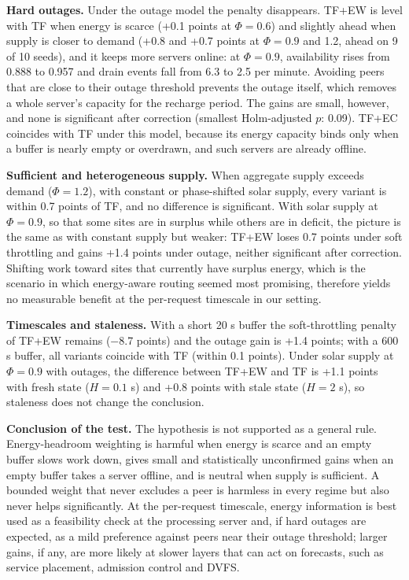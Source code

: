 \documentclass[journal]{IEEEtran}
\begin{document}
\textbf{Hard outages.} Under the outage model the penalty disappears. TF+EW is level with TF when energy is scarce (+0.1 points at \(\Phi=0.6\)) and slightly ahead when supply is closer to demand (+0.8 and +0.7 points at \(\Phi=0.9\) and 1.2, ahead on 9 of 10 seeds), and it keeps more servers online: at \(\Phi=0.9\), availability rises from 0.888 to 0.957 and drain events fall from 6.3 to 2.5 per minute. Avoiding peers that are close to their outage threshold prevents the outage itself, which removes a whole server's capacity for the recharge period. The gains are small, however, and none is significant after correction (smallest Holm-adjusted \(p\): 0.09). TF+EC coincides with TF under this model, because its energy capacity binds only when a buffer is nearly empty or overdrawn, and such servers are already offline.

\textbf{Sufficient and heterogeneous supply.} When aggregate supply exceeds demand (\(\Phi=1.2\)), with constant or phase-shifted solar supply, every variant is within 0.7 points of TF, and no difference is significant. With solar supply at \(\Phi=0.9\), so that some sites are in surplus while others are in deficit, the picture is the same as with constant supply but weaker: TF+EW loses 0.7 points under soft throttling and gains +1.4 points under outage, neither significant after correction. Shifting work toward sites that currently have surplus energy, which is the scenario in which energy-aware routing seemed most promising, therefore yields no measurable benefit at the per-request timescale in our setting.

\textbf{Timescales and staleness.} With a short 20 s buffer the soft-throttling penalty of TF+EW remains (−8.7 points) and the outage gain is +1.4 points; with a 600 s buffer, all variants coincide with TF (within 0.1 points). Under solar supply at \(\Phi=0.9\) with outages, the difference between TF+EW and TF is +1.1 points with fresh state (\(H=0.1\) s) and +0.8 points with stale state (\(H=2\) s), so staleness does not change the conclusion.

\textbf{Conclusion of the test.} The hypothesis is not supported as a general rule. Energy-headroom weighting is harmful when energy is scarce and an empty buffer slows work down, gives small and statistically unconfirmed gains when an empty buffer takes a server offline, and is neutral when supply is sufficient. A bounded weight that never excludes a peer is harmless in every regime but also never helps significantly. At the per-request timescale, energy information is best used as a feasibility check at the processing server and, if hard outages are expected, as a mild preference against peers near their outage threshold; larger gains, if any, are more likely at slower layers that can act on forecasts, such as service placement, admission control and DVFS.
\end{document}

